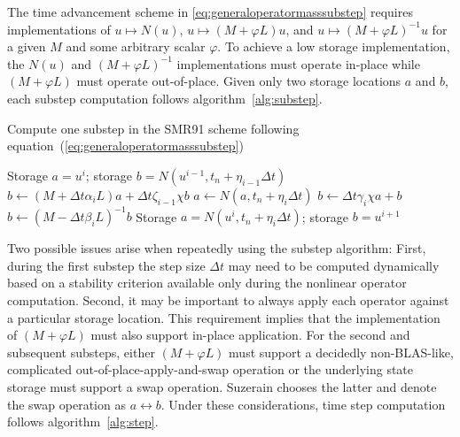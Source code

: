 \documentclass[letterpaper,11pt,nointlimits,reqno,draft]{amsart}
\begin{document}
The time advancement scheme in \eqref{eq:generaloperatormasssubstep} requires
implementations of $u\mapsto{}{N}\left(u\right)$,
$u\mapsto{}\left(M+\varphi{}L\right)u$, and
$u\mapsto{}\left(M+\varphi{}L\right)^{-1}u$ for a given $M$ and some arbitrary
scalar $\varphi$.  To achieve a low storage implementation, the
$N\left(u\right)$ and $\left(M+\varphi{}L\right)^{-1}$ implementations must
operate in-place while $\left(M+\varphi{}L\right)$ must operate out-of-place.
Given only two storage locations $a$ and $b$, each substep computation follows
algorithm~\vref{alg:substep}.

\begin{algorithm}
\label{alg:substep}
\caption{Compute one substep in the SMR91 scheme following
         equation~(\ref{eq:generaloperatormasssubstep})
         }
\begin{algorithmic}
  \REQUIRE Storage $a = u^i$;
           storage $b = N\left(u^{i-1},t_{n}+\eta_{i-1}\Delta{}t\right)$
  \STATE $b\leftarrow{}   \left(M+\Delta{}t\alpha_{i}L\right)a
                        + \Delta{}t\zeta_{i-1}\chi{}b$
  \STATE $a\leftarrow{}N\left(a,t_{n}+\eta_{i}\Delta{}t\right)$
  \STATE $b\leftarrow{}\Delta{}t\gamma_{i}\chi{}a + b$
  \STATE $b\leftarrow{}\left(M-\Delta{}t\beta_{i}L\right)^{-1}b$
  \ENSURE Storage $a = N\left(u^{i},t_{n}+\eta_{i}\Delta{}t\right)$;
          storage $b = u^{i+1}$
\end{algorithmic}
\end{algorithm}

Two possible issues arise when repeatedly using the substep algorithm: First,
during the first substep the step size $\Delta{}t$ may need to be computed
dynamically based on a stability criterion available only during the nonlinear
operator computation.  Second, it may be important to always apply each
operator against a particular storage location.  This requirement implies that
the implementation of $\left(M+\varphi{}L\right)$ must also support in-place
application.  For the second and subsequent substeps, either
$\left(M+\varphi{}L\right)$ must support a decidedly non-BLAS-like, complicated
out-of-place-apply-and-swap operation or the underlying state storage must
support a swap operation.  Suzerain chooses the latter and denote the swap operation
as $a\leftrightarrow{}b$.  Under these considerations, time step computation
follows algorithm~\vref{alg:step}.
\end{document}

